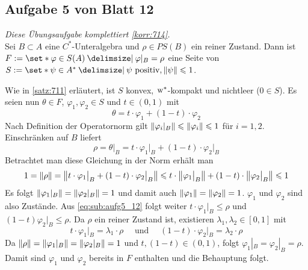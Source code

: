 \subsection{Aufgabe 5 von Blatt 12} %
\label{sub:aufg5_12}
\emph{Diese Übungsaufgabe komplettiert \autoref{korr:714}.}\smallskip\\
Sei $B \subset A$ eine $C^*$-Unteralgebra und $\rho \in PS(B)$ ein reiner Zustand.
Dann ist $F := \set*{\varphi \in S(A) \given \varphi|_B = \rho}$ eine Seite von $S := \set*{\psi \in A^* \given \psi \text{ positiv}, \norm*{\psi}\le 1}$.
\begin{beweis}
	Wie in \autoref{satz:711} erläutert, ist $S$ konvex, $\w^*$-kompakt und nichtleer ($0 \in S$).
	Es seien nun $\theta \in F$, $\varphi_1, \varphi_2 \in S$ und $t \in (0,1)$ mit
	\[
		\theta = t \cdot \varphi_1 + (1-t) \cdot \varphi_2
	\]
	Nach Definition der Operatornorm gilt $\norm*{\varphi_i|_B} \le \norm*{\varphi_i} \le 1$ für $i=1,2$.
	Einschränken auf $B$ liefert
	\begin{equation}
		\rho = \theta\big|_B = t \cdot \varphi_1\big|_B + (1-t) \cdot \varphi_2\big|_B \label{eq:sub:aufg5_12} \tag{\#}
	\end{equation}
	Betrachtet man diese Gleichung in der Norm erhält man
	\[
		1 = \norm*{\rho} = \norm*{t \cdot \varphi_1\big|_B + (1-t) \cdot \varphi_2\big|_B} \le t \cdot \norm*{\varphi_1\big|_B} + (1-t) \cdot \norm*{\varphi_2\big|_B} \le 1
	\]
	Es folgt $\norm*{\varphi_1|_B} = \norm*{\varphi_2|_B}=1$ und damit auch $\norm*{\varphi_1}=\norm*{\varphi_2}=1$. $\varphi_1$ und $\varphi_2$ sind also Zustände.
	Aus \eqref{eq:sub:aufg5_12} folgt weiter $t \cdot \varphi_1|_B \le \rho$ und $(1-t) \varphi_2|_B \le \rho$.
	Da $\rho$ ein reiner Zustand ist, existieren $\lambda_1, \lambda_2 \in [0,1]$ mit
	\[
		t \cdot \varphi_1\big|_B = \lambda_1 \cdot \rho \quad \text{ und } \quad (1-t) \cdot \varphi_2\big|_B = \lambda_2 \cdot \rho 
	\]
	Da $\norm*{\rho}=\norm*{\varphi_1|_B}=\norm*{\varphi_2|_B}=1$ und $t, (1-t) \in (0,1)$, folgt $\varphi_1|_B = \varphi_2|_B=\rho$.
	Damit sind $\varphi_1$ und $\varphi_2$ bereits in $F$ enthalten und die Behauptung folgt.
\end{beweis}


